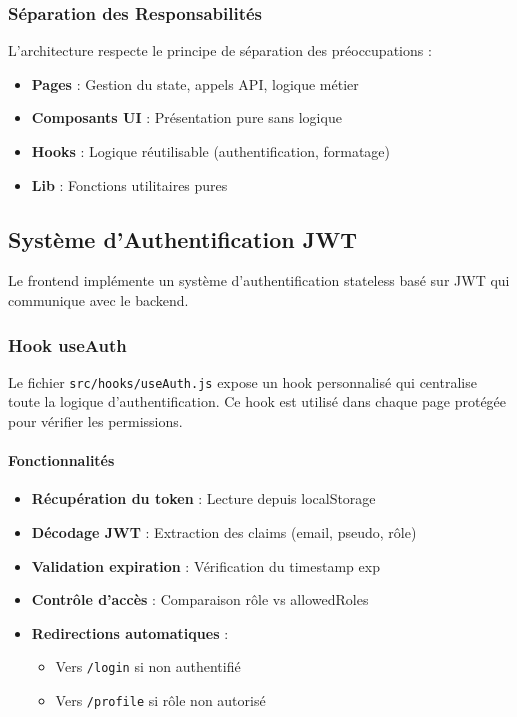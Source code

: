\subsubsection{Séparation des Responsabilités}

L'architecture respecte le principe de séparation des préoccupations :

\begin{itemize}
    \item \textbf{Pages} : Gestion du state, appels API, logique métier
    \item \textbf{Composants UI} : Présentation pure sans logique
    \item \textbf{Hooks} : Logique réutilisable (authentification, formatage)
    \item \textbf{Lib} : Fonctions utilitaires pures
\end{itemize}

\subsection{Système d'Authentification JWT}

Le frontend implémente un système d'authentification stateless basé sur JWT qui communique avec le backend.

\subsubsection{Hook useAuth}

Le fichier \texttt{src/hooks/useAuth.js} expose un hook personnalisé qui centralise toute la logique d'authentification. Ce hook est utilisé dans chaque page protégée pour vérifier les permissions.

\paragraph{Fonctionnalités}

\begin{itemize}
    \item \textbf{Récupération du token} : Lecture depuis localStorage
    \item \textbf{Décodage JWT} : Extraction des claims (email, pseudo, rôle)
    \item \textbf{Validation expiration} : Vérification du timestamp exp
    \item \textbf{Contrôle d'accès} : Comparaison rôle vs allowedRoles
    \item \textbf{Redirections automatiques} :
    \begin{itemize}
        \item Vers \texttt{/login} si non authentifié
        \item Vers \texttt{/profile} si rôle non autorisé
    \end{itemize}
\end{itemize}

